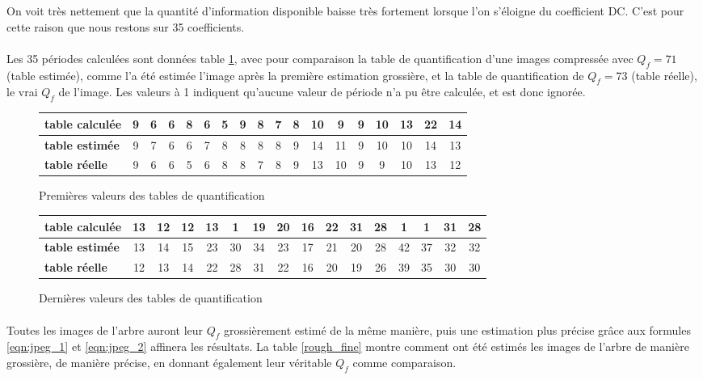 \documentclass[utf8,final]{stageM2R} %
\begin{document}
On voit très nettement que la quantité d'information disponible baisse très fortement lorsque l'on s'éloigne du coefficient DC. C'est pour cette raison que nous restons sur 35 coefficients.

\paragraph{}
Les 35 périodes calculées sont données table \ref{periods}, avec pour comparaison la table de quantification d'une images compressée avec $Q_f = 71$ (table estimée), comme l'a été estimée l'image après la première estimation grossière, et la table de quantification de $Q_f = 73$ (table réelle), le vrai $Q_f$ de l'image. Les valeurs à 1 indiquent qu'aucune valeur de période n'a pu être calculée, et est donc ignorée.

\begin{figure}
  \centering
  \begin{tabular}{|l||c|c|c|c|c|c|c|c|c|c|c|c|c|c|c|c|c|}
    \hline
    \textbf{table calculée}  & 9 & 6 & 6 & 8 & 6 & 5 & 9 & 8 & 7 & 8 & 10 & 9 & 9 & 10 & 13 & 22 & 14 \\ \hline
    \textbf{table estimée} & 9 & 7 & 6 & 6 & 7 & 8 & 8 & 8 & 8 & 9 & 14 & 11 & 9 & 10 & 10 & 14 & 13 \\ \hline
    \textbf{table réelle} & 9 & 6 & 6 & 5 & 6 & 8 & 8 & 7 & 8 & 9 & 13 & 10 & 9 & 9 & 10 & 13 & 12 \\ \hline
  \end{tabular}
  \caption{Premières valeurs des tables de quantification}
  \begin{tabular}{|l||c|c|c|c|c|c|c|c|c|c|c|c|c|c|c|}
    \hline
    \textbf{table calculée}  & 13 & 12 & 12 & 13 & 1 & 19 & 20 & 16 & 22 & 31 & 28 & 1 & 1 & 31 & 28 \\ \hline
    \textbf{table estimée} & 13 & 14 & 15 & 23 & 30 & 34 & 23 & 17 & 21 & 20 & 28 & 42 & 37 & 32 & 32 \\ \hline
    \textbf{table réelle} & 12 & 13 & 14 & 22 & 28 & 31 & 22 & 16 & 20 & 19 & 26 & 39 & 35 & 30 & 30 \\ \hline
  \end{tabular}

  \caption{Dernières valeurs des tables de quantification}
  \label{periods}
\end{figure}

\paragraph{}
Toutes les images de l'arbre auront leur $Q_f$ grossièrement estimé de la même manière, puis une estimation plus précise grâce aux formules \ref{eqn:jpeg_1} et \ref{eqn:jpeg_2} affinera les résultats. La table \ref{rough_fine} montre comment ont été estimés les images de l'arbre de manière grossière, de manière précise, en donnant également leur véritable $Q_f$ comme comparaison.
\end{document}
